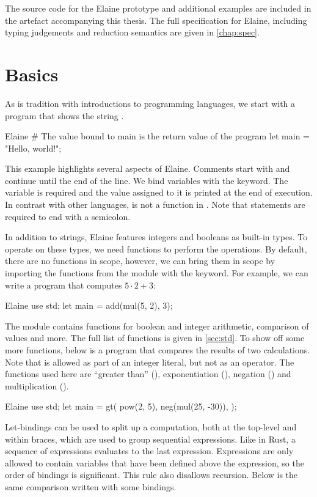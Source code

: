 The source code for the Elaine prototype and additional examples are included in the artefact accompanying this thesis. The full specification for Elaine, including typing judgements and reduction semantics are given in \cref{chap:spec}.

\section{Basics}

As is tradition with introductions to programming languages, we start with a program that shows the string .

\begin{lst}{Elaine}
# The value bound to main is the return value of the program
let main = "Hello, world!";
\end{lst}
%
This example highlights several aspects of Elaine. Comments start with \el{#} and continue until the end of the line. We bind variables with the  keyword. The  variable is required and the value assigned to it is printed at the end of execution. In contrast with other languages,  is not a function in . Note that statements are required to end with a semicolon.

In addition to strings, Elaine features integers and booleans as built-in types. To operate on these types, we need functions to perform the operations. By default, there are no functions in scope, however, we can bring them in scope by importing the functions from the  module with the  keyword. For example, we can write a program that computes $5 \cdot 2 + 3$:

\begin{lst}{Elaine}
use std;
let main = add(mul(5, 2), 3);
\end{lst}
%
The  module contains functions for boolean and integer arithmetic, comparison of values and more. The full list of functions is given in \cref{sec:std}. To show off some more functions, below is a program that compares the results of two calculations. Note that \el{-} is allowed as part of an integer literal, but not as an operator. The functions used here are ``greater than'' (), exponentiation (), negation () and multiplication ().

\begin{lst}{Elaine}
use std;
let main = gt(
    pow(2, 5),
    neg(mul(25, -30)),
);
\end{lst}
%
Let-bindings can be used to split up a computation, both at the top-level and within braces, which are used to group sequential expressions. Like in Rust, a sequence of expressions evaluates to the last expression. Expressions are only allowed to contain variables that have been defined above the expression, so the order of bindings is significant. This rule also disallows recursion. Below is the same comparison written with some bindings.

